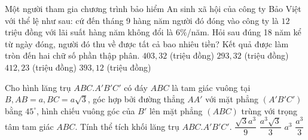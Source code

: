 \begin{ex}%
Một người tham gia chương trình bảo hiểm An sinh xã hội của công ty Bảo Việt với thể lệ như sau: cứ đến tháng 9 hàng năm người đó đóng vào công ty là $12$ triệu đồng với lãi suất hàng năm không đổi là $6\%$/năm. Hỏi sau đúng 18 năm kể từ ngày đóng, người đó thu về được tất cả bao nhiêu tiền? Kết quả được làm tròn đến hai chữ số phần thập phân.
\choice
{$403,32$ (triệu đồng)}
{$293,32$ (triệu đồng)}
{$412,23$ (triệu đồng)}
{\True $393,12$ (triệu đồng)}

\end{ex}
\begin{ex}%
Cho hình lăng trụ $ABC.A'B'C'$ có đáy $ABC$ là tam giác vuông tại $B, AB =a,BC=a\sqrt{3}$, góc hợp bởi đường thẳng $AA'$ với mặt phẳng $(A'B'C')$ bằng $45^{\circ}$, hình chiếu vuông góc của $B'$ lên mặt phẳng $(ABC)$  trùng với trọng tâm tam giác $ABC$. Tính thể tích khối lăng trụ $ABC.A'B'C'$.
\choice
{$\dfrac{\sqrt{3}a^3}{9}$}
{\True $\dfrac{a^3\sqrt{3}}{3}$}
{$a^3$}
{$\dfrac{a^3}{3}$}
\end{ex}
